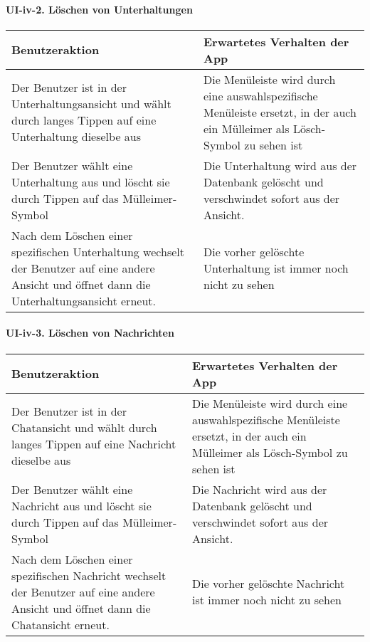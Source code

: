 \paragraph{UI-iv-2. Löschen von
Unterhaltungen}\label{luxf6schen-von-unterhaltungen}

\begin{longtable}{|p{8cm}|p{8.5cm}|}
\hline
Benutzeraktion & Erwartetes Verhalten der App\tabularnewline
\hline

Der Benutzer ist in der Unterhaltungsansicht und wählt durch langes
Tippen auf eine Unterhaltung dieselbe aus & Die Menüleiste wird durch
eine auswahlspezifische Menüleiste ersetzt, in der auch ein Mülleimer
als Lösch-Symbol zu sehen ist\tabularnewline
Der Benutzer wählt eine Unterhaltung aus und löscht sie durch Tippen auf
das Mülleimer-Symbol & Die Unterhaltung wird aus der Datenbank gelöscht
und verschwindet sofort aus der Ansicht.\tabularnewline
Nach dem Löschen einer spezifischen Unterhaltung wechselt der Benutzer
auf eine andere Ansicht und öffnet dann die Unterhaltungsansicht erneut.
& Die vorher gelöschte Unterhaltung ist immer noch nicht zu
sehen\tabularnewline
\hline
\end{longtable}

\paragraph{UI-iv-3. Löschen von
Nachrichten}\label{luxf6schen-von-nachrichten}

\begin{longtable}{|p{8cm}|p{8.5cm}|}
\hline
Benutzeraktion & Erwartetes Verhalten der App\tabularnewline
\hline

Der Benutzer ist in der Chatansicht und wählt durch langes Tippen auf
eine Nachricht dieselbe aus & Die Menüleiste wird durch eine
auswahlspezifische Menüleiste ersetzt, in der auch ein Mülleimer als
Lösch-Symbol zu sehen ist\tabularnewline
Der Benutzer wählt eine Nachricht aus und löscht sie durch Tippen auf
das Mülleimer-Symbol & Die Nachricht wird aus der Datenbank gelöscht und
verschwindet sofort aus der Ansicht.\tabularnewline
Nach dem Löschen einer spezifischen Nachricht wechselt der Benutzer auf
eine andere Ansicht und öffnet dann die Chatansicht erneut. & Die vorher
gelöschte Nachricht ist immer noch nicht zu sehen\tabularnewline
\hline
\end{longtable}




